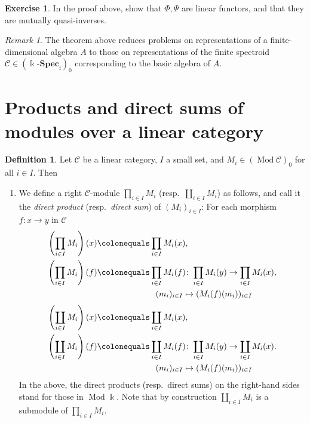 \documentclass{surv-l}
\numberwithin{equation}{chapter}
\numberwithin{figure}{chapter}
\theoremstyle{plain}
\theoremstyle{definition}
\newtheorem{dfn}[thm]{Definition}
\newtheorem{exc}[thm]{Exercise}
\theoremstyle{remark}
\newtheorem{rmk}[thm]{Remark}
\DeclareMathOperator{\Mod}{Mod}
\begin{document}
\begin{exc}
In the proof above, show that $\Phi, \Psi$ are linear functors, and that
they are mutually quasi-inverses.
\end{exc}

\begin{rmk}
The theorem above reduces problems on
representations of a finite-dimensional algebra  $A$ to
those on representations of the finite spectroid ${\mathcal{C}} \in (\Bbbk\text{-}\mathbf{Spec}_{\mathrm{f}})_0$
corresponding to the basic algebra of $A$.
\end{rmk}

\section{Products and direct sums of modules over a linear category}\begin{dfn}\label{dfn:prod-coprod-mod}
Let ${\mathcal{C}}$ be a linear category, $I$ a small set, and
$M_i \in (\Mod{\mathcal{C}})_0$ for all $i\in I$.
Then
\begin{enumerate}
\item
We define a right ${\mathcal{C}}$-module
$\prod_{i\in I} M_i$ (resp.\ $\coprod_{i \in I} M_i$) as follows, and call it
the \emph{direct product} (resp.\ \emph{direct sum}) of
$(M_i)_{i\in I}$:
For each morphism $f \colon x \to y$ in
${\mathcal{C}}$
\[
\begin{aligned}
\left(\prod_{i\in I} M_i\right)(x)&\colonequals  \prod_{i\in I} M_i(x),\\
\left(\prod_{i\in I} M_i\right)(f)&\colonequals 
\prod_{i\in I} M_i(f) \colon \prod_{i\in I} M_i(y) \to \prod_{i\in I} M_i(x),\\
&\hspace{7em}(m_i)_{i\in I} \mapsto (M_i(f)(m_i))_{i\in I}\end{aligned}
\]
\[
\begin{aligned}
\left(\coprod_{i\in I} M_i\right)(x)&\colonequals  \coprod_{i\in I} M_i(x),\\
\left(\coprod_{i\in I} M_i\right)(f)&\colonequals 
\coprod_{i\in I} M_i(f) \colon \coprod_{i\in I} M_i(y) \to \coprod_{i\in I} M_i(x).\\
&\hspace{7em}(m_i)_{i\in I} \mapsto (M_i(f)(m_i))_{i\in I}\end{aligned}
\]
In the above, the direct products (resp.\ direct sums) on the right-hand sides
stand for those in $\Mod\Bbbk$.
Note that by construction $\coprod_{i \in I} M_i$
is a submodule of $\prod_{i \in I} M_i$.


\end{enumerate}
\end{dfn}
\end{document}
